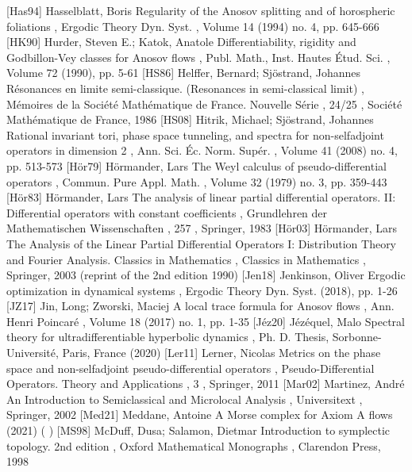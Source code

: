  [Has94] Hasselblatt, Boris Regularity of the Anosov splitting and of horospheric foliations , Ergodic Theory Dyn. Syst. , Volume 14 (1994) no. 4, pp. 645-666
 [HK90] Hurder, Steven E.; Katok, Anatole Differentiability, rigidity and Godbillon-Vey classes for Anosov flows , Publ. Math., Inst. Hautes Étud. Sci. , Volume 72 (1990), pp. 5-61
 [HS86] Helffer, Bernard; Sjöstrand, Johannes Résonances en limite semi-classique. (Resonances in semi-classical limit) , Mémoires de la Société Mathématique de France. Nouvelle Série , 24/25 , Société Mathématique de France, 1986
 [HS08] Hitrik, Michael; Sjöstrand, Johannes Rational invariant tori, phase space tunneling, and spectra for non-selfadjoint operators in dimension 2 , Ann. Sci. Éc. Norm. Supér. , Volume 41 (2008) no. 4, pp. 513-573
 [Hör79] Hörmander, Lars The Weyl calculus of pseudo-differential operators , Commun. Pure Appl. Math. , Volume 32 (1979) no. 3, pp. 359-443
 [Hör83] Hörmander, Lars The analysis of linear partial differential operators. II: Differential operators with constant coefficients , Grundlehren der Mathematischen Wissenschaften , 257 , Springer, 1983
 [Hör03] Hörmander, Lars The Analysis of the Linear Partial Differential Operators I: Distribution Theory and Fourier Analysis. Classics in Mathematics , Classics in Mathematics , Springer, 2003 (reprint of the 2nd edition 1990)
 [Jen18] Jenkinson, Oliver Ergodic optimization in dynamical systems , Ergodic Theory Dyn. Syst. (2018), pp. 1-26
 [JZ17] Jin, Long; Zworski, Maciej A local trace formula for Anosov flows , Ann. Henri Poincaré , Volume 18 (2017) no. 1, pp. 1-35
 [Jéz20] Jézéquel, Malo Spectral theory for ultradifferentiable hyperbolic dynamics , Ph. D. Thesis, Sorbonne-Université, Paris, France (2020)
 [Ler11] Lerner, Nicolas Metrics on the phase space and non-selfadjoint pseudo-differential operators , Pseudo-Differential Operators. Theory and Applications , 3 , Springer, 2011
 [Mar02] Martinez, André An Introduction to Semiclassical and Microlocal Analysis , Universitext , Springer, 2002
 [Med21] Meddane, Antoine A Morse complex for Axiom A flows (2021) ( )
 [MS98] McDuff, Dusa; Salamon, Dietmar Introduction to symplectic topology. 2nd edition , Oxford Mathematical Monographs , Clarendon Press, 1998

